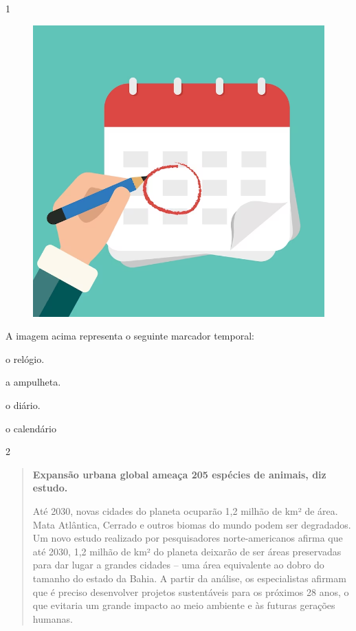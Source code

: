 \begin{itemize}
\begin{itemize}
\begin{itemize}
\begin{itemize}
{{\begin{itemize}
\begin{itemize}
\num{1}

\begin{figure}[htpb!]
\includegraphics[width=.5\textwidth]{./imgs/img69.png}
\end{figure}

A imagem acima representa o seguinte marcador temporal:

\begin{escolha}
\item o relógio.

\item a ampulheta.

\item o diário.

\item o calendário
\end{escolha}


\num{2}

\begin{quote}
\textbf{Expansão urbana global ameaça 205 espécies de animais, diz estudo.}

Até 2030, novas cidades do planeta ocuparão 1,2 milhão de km² de área.
Mata Atlântica, Cerrado e outros biomas do mundo podem ser degradados.
Um novo estudo realizado por pesquisadores norte-americanos afirma que
até 2030, 1,2 milhão de km² do planeta deixarão de ser áreas preservadas
para dar lugar a grandes cidades -- uma área equivalente ao dobro do
tamanho do estado da Bahia. A partir da análise, os especialistas
afirmam que é preciso desenvolver projetos sustentáveis para os próximos
28 anos, o que evitaria um grande impacto ao meio ambiente e às futuras
gerações humanas.
\end{quote}


\end{itemize}
\end{itemize}}}
\end{itemize}
\end{itemize}
\end{itemize}
\end{itemize}
